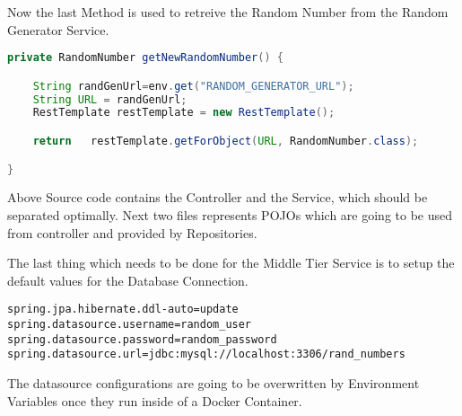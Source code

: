 Now the last Method is used to retreive the Random Number from the Random Generator Service.
\begin{lstlisting}[language=Java]
private RandomNumber getNewRandomNumber() {

    String randGenUrl=env.get("RANDOM_GENERATOR_URL");
    String URL = randGenUrl;
    RestTemplate restTemplate = new RestTemplate();

    return   restTemplate.getForObject(URL, RandomNumber.class);

}
\end{lstlisting}
Above Source code contains the Controller and the Service, which should be separated optimally.
Next two files represents POJOs which are going to be used from controller and provided by Repositories.

The last thing which needs to be done for the Middle Tier Service is to setup the default values for the Database Connection.
\begin{lstlisting}
spring.jpa.hibernate.ddl-auto=update
spring.datasource.username=random_user
spring.datasource.password=random_password
spring.datasource.url=jdbc:mysql://localhost:3306/rand_numbers
\end{lstlisting}
The datasource configurations are going to be overwritten by Environment Variables once they run inside of a Docker Container.

